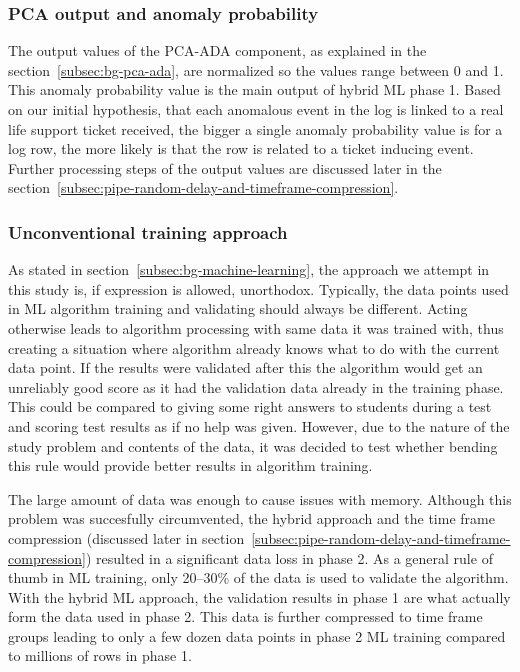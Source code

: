 \subsubsection*{PCA output and anomaly probability}

The output values of the PCA-ADA component,
as explained in the section~\ref{subsec:bg-pca-ada},
are normalized so the values range between 0 and 1.
This anomaly probability value
is the main output of hybrid ML phase 1.
Based on our initial hypothesis,
that each anomalous event in the log
is linked to a real life support ticket received,
the bigger a single anomaly probability value is for a log row,
the more likely is that the row is related to a ticket inducing event.
Further processing steps of the output values
are discussed later in the section~\ref{subsec:pipe-random-delay-and-timeframe-compression}.



\subsubsection*{Unconventional training approach}\label{subsec:pipe-unconventional-training}

As stated in section~\ref{subsec:bg-machine-learning},
the approach we attempt in this study is,
if expression is allowed, unorthodox.
Typically,
the data points used in ML algorithm training and validating
should always be different.
Acting otherwise leads to algorithm processing with
same data it was trained with,
thus creating a situation
where algorithm already knows what to do with the current data point.
If the results were validated after this
the algorithm would get an unreliably good score
as it had the validation data already in the training phase.
This could be compared to
giving some right answers to students during a test
and scoring test results as if no help was given.
However,
due to the nature of the study problem and contents of the data,
it was decided to test whether bending this rule
would provide better results in algorithm training.

The large amount of data was enough
to cause issues with memory.
Although this problem was succesfully circumvented,
the hybrid approach and the time frame compression
(discussed later in section~\ref{subsec:pipe-random-delay-and-timeframe-compression})
resulted in a significant data loss in phase 2.
As a general rule of thumb in ML training,
only 20--30\% of the data is used to validate the algorithm.
With the hybrid ML approach,
the validation results in phase 1
are what actually form the data used in phase 2.
This data is further compressed to time frame groups
leading to only a few dozen data points in phase 2 ML training
compared to millions of rows in phase 1.

